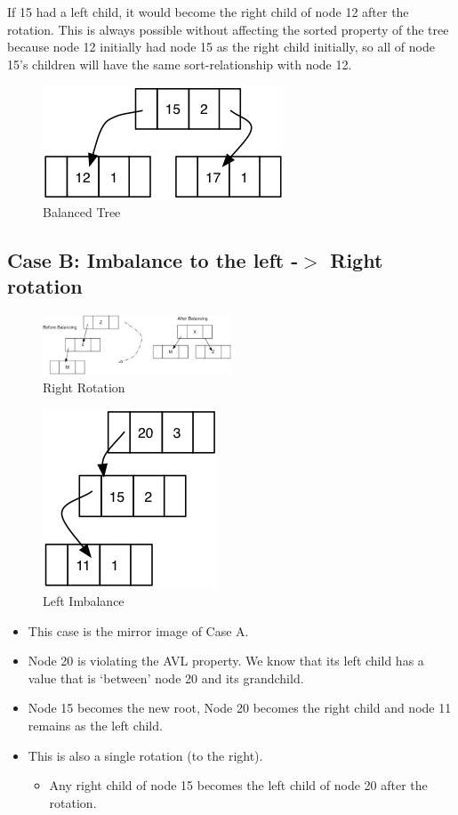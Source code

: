 If 15 had a left child, it would become the right child of node 12 after the rotation. This is always possible  without affecting the sorted property of the tree because node 12 initially had node 15 as the right child initially,  so all of node 15's children will have the same sort-relationship with node 12.

\begin{figure}[H]
\centering
\includegraphics{pictures/tree17.png}
\caption{Balanced Tree}
\label{fig:tree17}
\end{figure}


\subsection{Case B: Imbalance to the left -$>$ Right rotation}

\begin{figure}[H]
\centering
\includegraphics[width=0.5\textwidth]{pictures/rightrotate.jpg}
\caption{Right Rotation}
\label{fig:rightrotate}
\end{figure}
\begin{figure}[H]
\centering
\includegraphics{pictures/tree18.png}
\caption{Left Imbalance}
\label{fig:tree18}
\end{figure}
\begin{itemize}
	\item This case is the mirror image of Case A.
	\item Node 20 is violating the AVL property. We know that its left child has a value that is ‘between’ node 20 and its grandchild.
	\item Node 15 becomes the new root, Node 20 becomes the right child and node 11 remains as the left child.
	\item This is also a single rotation (to the right).
\begin{itemize}
	\item Any right child of node 15 becomes the left child of node 20 after the rotation.
\end{itemize}
\end{itemize}

